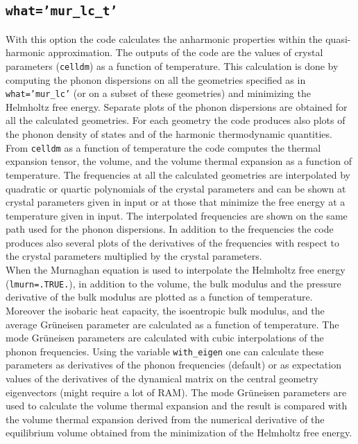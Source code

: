 \documentclass[12pt,a4paper]{article}
\begin{document}
\subsection{\color{web-blue}\texttt{what='mur\_lc\_t'}}
With this option the code calculates the anharmonic 
properties within the quasi-harmonic approximation. 
The outputs of the code are the values of crystal parameters 
(\texttt{celldm}) as a function of temperature. This calculation is done 
by computing the phonon dispersions on all the geometries specified as in
\texttt{what='mur\_lc'} (or on a subset of these geometries) and 
minimizing the Helmholtz free energy.
Separate plots of the phonon dispersions are obtained for all the 
calculated geometries.
For each geometry the code produces also plots of the phonon density
of states and of the harmonic thermodynamic quantities.
From \texttt{celldm} as a function of temperature the code computes the thermal
expansion tensor, the volume, and the volume thermal expansion as a 
function of temperature. 
The frequencies at all the calculated geometries are interpolated
by quadratic or quartic polynomials of the crystal parameters
and can be shown at crystal parameters given in input or at those that
minimize the free energy at a temperature given in input. The 
interpolated frequencies  
are shown on the same path used for the phonon dispersions.
In addition to the frequencies the code produces also several plots of
the derivatives of the frequencies with respect to the crystal parameters
multiplied by the crystal parameters. \\
When the Murnaghan equation is used to interpolate the
Helmholtz free energy (\texttt{lmurn=.TRUE.}), in addition to the volume, 
the bulk modulus and the pressure derivative of the bulk modulus are 
plotted as a function of 
temperature. Moreover the isobaric heat capacity, the isoentropic 
bulk modulus, and the average Gr\"uneisen parameter are calculated as 
a function of temperature.
The mode Gr\"uneisen parameters are calculated with cubic interpolations of the
phonon frequencies. Using the variable \texttt{with\_eigen} one can 
calculate these parameters as derivatives of the phonon frequencies 
(default) or as expectation values of the derivatives of the dynamical 
matrix on the central geometry eigenvectors (might require a lot of RAM). 
The mode Gr\"uneisen parameters are used to calculate the volume
thermal expansion and the result is compared with the volume thermal expansion
derived from the numerical derivative of the equilibrium volume obtained
from the minimization of the Helmholtz free energy. 
\end{document}
